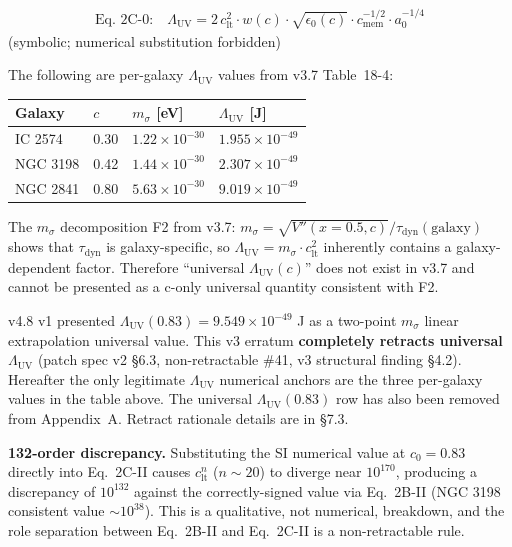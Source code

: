 \documentclass[11pt,a4paper]{article}
\newcommand{\epso}{\epsilon_0}
\newcommand{\cmem}{c_{\mathrm{mem}}}
\newcommand{\Lambdauv}{\Lambda_{\mathrm{UV}}}
\newcommand{\msigma}{m_{\sigma}}
\newcommand{\clt}{c_{\mathrm{lt}}}
\begin{document}
\begin{keybox}
\begin{align*}
\text{Eq.~2C-0:}\quad \Lambdauv = 2\,\clt^2 \cdot w(c) \cdot \sqrt{\epso(c)} \cdot \cmem^{-1/2} \cdot a_0^{-1/4}
\end{align*}
(symbolic; numerical substitution forbidden)
\end{keybox}
The following are per-galaxy $\Lambdauv$ values from v3.7 Table~18-4:

\begin{center}\small
\begin{tabular}{@{}llll@{}}
\toprule
Galaxy & $c$ & $\msigma$ [eV] & $\Lambdauv$ [J] \\
\midrule
IC 2574  & 0.30 & $1.22 \times 10^{-30}$ & $1.955 \times 10^{-49}$ \\
NGC 3198 & 0.42 & $1.44 \times 10^{-30}$ & $2.307 \times 10^{-49}$ \\
NGC 2841 & 0.80 & $5.63 \times 10^{-30}$ & $9.019 \times 10^{-49}$ \\
\bottomrule
\end{tabular}
\end{center}

The $\msigma$ decomposition F2 from v3.7: $\msigma = \sqrt{V''(x=0.5, c)}/\tau_{\mathrm{dyn}}(\mathrm{galaxy})$
shows that $\tau_{\mathrm{dyn}}$ is galaxy-specific, so $\Lambdauv = \msigma \cdot \clt^2$ inherently
contains a galaxy-dependent factor. Therefore ``universal $\Lambdauv(c)$'' does not exist in
v3.7 and cannot be presented as a c-only universal quantity consistent with F2.

v4.8 v1 presented $\Lambdauv(0.83) = 9.549 \times 10^{-49}$ J as a two-point $\msigma$ linear
extrapolation universal value. This v3 erratum \textbf{completely retracts universal $\Lambdauv$}
(patch spec v2 \S 6.3, non-retractable \#41, v3 structural finding \S 4.2). Hereafter the only
legitimate $\Lambdauv$ numerical anchors are the three per-galaxy values in the table above.
The universal $\Lambdauv(0.83)$ row has also been removed from Appendix~A. Retract rationale
details are in \S 7.3.

\medskip\noindent
\textbf{132-order discrepancy.}
Substituting the SI numerical value at $c_0 = 0.83$ directly into Eq.~2C-II causes
$\clt^{n}$ ($n \sim 20$) to diverge near $10^{170}$, producing a discrepancy of $10^{132}$ against
the correctly-signed value via Eq.~2B-II (NGC 3198 consistent value $\sim 10^{38}$). This is a
qualitative, not numerical, breakdown, and the role separation between Eq.~2B-II and Eq.~2C-II is
a non-retractable rule.
\end{document}
